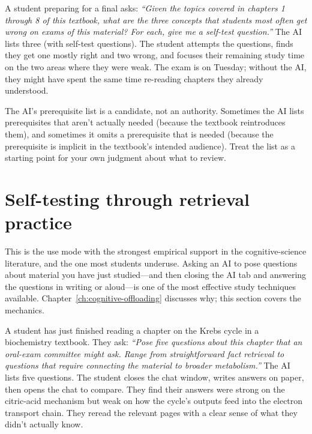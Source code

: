 \documentclass[11pt]{book}
\begin{document}
\begin{example}
A student preparing for a final asks: \emph{``Given the topics covered in chapters 1 through 8 of this textbook, what are the three concepts that students most often get wrong on exams of this material? For each, give me a self-test question.''} The AI lists three (with self-test questions). The student attempts the questions, finds they get one mostly right and two wrong, and focuses their remaining study time on the two areas where they were weak. The exam is on Tuesday; without the AI, they might have spent the same time re-reading chapters they already understood.
\end{example}

\begin{watchout}
The AI's prerequisite list is a candidate, not an authority. Sometimes the AI lists prerequisites that aren't actually needed (because the textbook reintroduces them), and sometimes it omits a prerequisite that is needed (because the prerequisite is implicit in the textbook's intended audience). Treat the list as a starting point for your own judgment about what to review.
\end{watchout}

\section{Self-testing through retrieval practice}

This is the use mode with the strongest empirical support in the cognitive-science literature, and the one most students underuse. Asking an AI to pose questions about material you have just studied---and then closing the AI tab and answering the questions in writing or aloud---is one of the most effective study techniques available. Chapter~\ref{ch:cognitive-offloading} discusses why; this section covers the mechanics.

\begin{example}
A student has just finished reading a chapter on the Krebs cycle in a biochemistry textbook. They ask: \emph{``Pose five questions about this chapter that an oral-exam committee might ask. Range from straightforward fact retrieval to questions that require connecting the material to broader metabolism.''} The AI lists five questions. The student closes the chat window, writes answers on paper, then opens the chat to compare. They find their answers were strong on the citric-acid mechanism but weak on how the cycle's outputs feed into the electron transport chain. They reread the relevant pages with a clear sense of what they didn't actually know.
\end{example}
\end{document}
